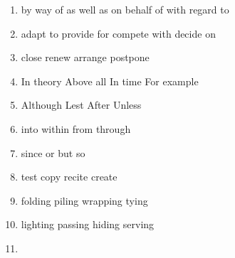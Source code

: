 \begin{enumerate}
	\item

\fourchoices
{by way of}
{as well as}
{on behalf of}
{with regard to}


\item

\fourchoices
{adapt to}
{provide for}
{compete with}
{decide on}



\item


\fourchoices
{close}
{renew}
{arrange}
{postpone}




\item


\fourchoices
{In theory}
{Above all}
{In time}
{For example}





\item


\fourchoices
{Although}
{Lest}
{After}
{Unless}




\item


\fourchoices
{into}
{within}
{from}
{through}




\item

\fourchoices
{since}
{or}
{but}
{so}



\item


\fourchoices
{test}
{copy}
{recite}
{create}




\item


\fourchoices
{folding}
{piling}
{wrapping}
{tying}




\item


\fourchoices
{lighting}
{passing}
{hiding}
{serving}




\item


\end{enumerate}
